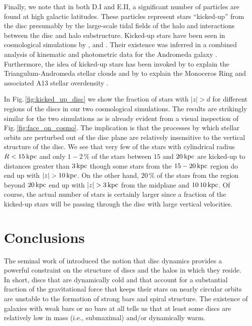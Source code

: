 Finally, we note that in both D.I and E.II, a significant number of
particles are found at high galactic latitudes.  These particles
represent stars ``kicked-up'' from the disc presumably by the
large-scale tidal fields of the halo and interactions between the disc
and halo substructure.  Kicked-up stars have been seen in cosmological
simulations by \citet{purcell2010}, \citet{mccarthy2012} and
\citet{tissera2013}.  Their existence was inferred in a combined
analysis of kinematic and photometric data for the Andromeda galaxy
\citep{dorman2013}.  Furthermore, the idea of kicked-up stars has been
invoked by \citep{pricewhelan2015} to explain the Triangulum-Andromeda
stellar clouds \citep{rochapinto2003, martin2014} and by
\citep{sheffield2018} to explain the Monoceros Ring \citep{yanny2000,
  newberg_2002} and associated A13 stellar overdensity
\citep{sharma2010}.

In Fig.\,\ref{fig:kicked_up_disc} we show the fraction of stars with
$|z|>d$ for different regions of the discs in our two cosmological
simulations.  The results are strikingly similar for the two
simulations as is already evident from a visual inspection of 
Fig.\,\ref{fig:face_on_cosmo}. The implication is that
the processes by which stellar orbits are
perturbed out of the disc plane are relatively insensitive to the
vertical structure of the disc.  We see that very few of the stars
with cylindrical radius $R<15\,{\rm kpc}$ and only $1-2\,\%$ of the
stars between $15$ and $20\,{\rm kpc}$ are kicked-up to distances
greater than $3\,{\rm kpc}$ though some stars from the $15-20\,{\rm
  kpc}$ region do end up with $|z|> 10\,{\rm kpc}$.  On the other
hand, $20\,\%$ of the stars from the region beyond $20\,{\rm kpc}$ end
up with $|z|> 3\,{\rm kpc}$ from the midplane and $10\,%
10\,{\rm kpc}$.  Of course, the actual number of stars is certainly
larger since a fraction of the kicked-up stars will be passing through
the disc with large vertical velocities.

\section{Conclusions}\label{sec:conclusions}

The seminal work of \citet{PeeblesOstriker1973} introduced the notion
that disc dynamics provides a powerful constraint on the structure of
discs and the halos in which they reside.  In short, discs that are
dynamically cold and that account for a substantial fraction of the
gravitational force that keeps their stars on nearly circular orbits
are unstable to the formation of strong bars and spiral structure.
The existence of galaxies with weak bars or no bars at all tells us
that at least some discs are relatively low in mass (i.e., submaximal)
and/or dynamically warm.


